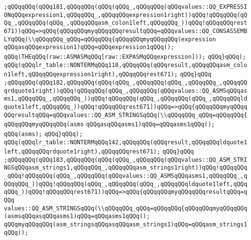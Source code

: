 \verb|;qQQqqQQq(qQQq181,qQQqqQQq(qQQq(qQQq_,qQQqqQQq(qQQqvalues::QQ_EXPRESSIONqQQqexpression1,qQQqqQQq_,qQQqqQQqexpression1right))qQQq!qQQqqQQq(qQQq_,qQQqqQQq(qQQq_,qQQqqQQqasm_colon1left,qQQqqQQq_))qQQq!qQQqqQQqrest671))qQQq=>qQQq{qQQqqQQqmyqQQqqQQqresultqQQq=qQQqvalues::QQ_CONSASSEMBLYqQQq(\\qQQqqQQq_qQQq=qQQqqQQq{qQQqqQQqmyqQQqqQQq(expression|\newline
\verb|qQQqasqQQqexpression1)qQQq=qQQqexpression1qQQq();|\newline
\verb|qQQq(THEqQQq(raw::ASMASMqQQq[raw::EXPASMqQQqexpression]));|\newline
\verb|qQQq}qQQq);|\newline
\verb|qQQq(qQQqlr_table::NONTERMqQQq118,qQQqqQQq(qQQqresult,qQQqqQQqasm_colon1left,qQQqqQQqexpression1right),qQQqqQQqrest671);|\newline
\verb|qQQq}qQQq|\newline
\verb|;qQQqqQQq(qQQq182,qQQqqQQq(qQQq(qQQq_,qQQqqQQq(qQQq_,qQQqqQQq_,qQQqqQQqrdquote1right))qQQq!qQQqqQQq(qQQq_,qQQqqQQq(qQQqvalues::QQ_ASMSqQQqasms1,qQQqqQQq_,qQQqqQQq_))qQQq!qQQqqQQq(qQQq_,qQQqqQQq(qQQq_,qQQqqQQqldquote1left,qQQqqQQq_))qQQq!qQQqqQQqrest671))qQQq=>qQQq{qQQqqQQqmyqQQqqQQqresultqQQq=qQQqvalues::QQ_ASM_STRINGSqQQq(\\qQQqqQQq_qQQq=qQQqqQQq{qQQqqQQqmyqQQqqQQq(asms|\newline
\verb|qQQqasqQQqasms1)qQQq=qQQqasms1qQQq();|\newline
\verb|qQQq(asms);|\newline
\verb|qQQq}qQQq);|\newline
\verb|qQQq(qQQqlr_table::NONTERMqQQq142,qQQqqQQq(qQQqresult,qQQqqQQqldquote1left,qQQqqQQqrdquote1right),qQQqqQQqrest671);|\newline
\verb|qQQq}qQQq|\newline
\verb|;qQQqqQQq(qQQq183,qQQqqQQq(qQQq(qQQq_,qQQqqQQq(qQQqvalues::QQ_ASM_STRINGSqQQqasm_strings1,qQQqqQQq_,qQQqqQQqasm_strings1right))qQQq!qQQqqQQq_qQQq!qQQqqQQq(qQQq_,qQQqqQQq(qQQqvalues::QQ_ASMSqQQqasms1,qQQqqQQq_,qQQqqQQq_))qQQq!qQQqqQQq(qQQq_,qQQqqQQq(qQQq_,qQQqqQQqldquote1left,qQQqqQQq_))qQQq!qQQqqQQqrest671))qQQq=>qQQq{qQQqqQQqmyqQQqqQQqresultqQQq=qQQq|\newline
\verb|values::QQ_ASM_STRINGSqQQq(\\qQQqqQQq_qQQq=qQQqqQQq{qQQqqQQqmyqQQqqQQq(asmsqQQqasqQQqasms1)qQQq=qQQqasms1qQQq();|\newline
\verb|qQQqmyqQQqqQQq(asm_stringsqQQqasqQQqasm_strings1)qQQq=qQQqasm_strings1qQQq();|\newline
